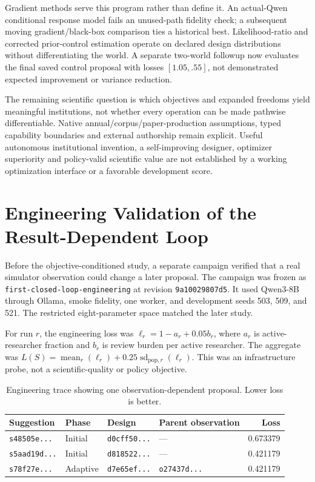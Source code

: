 \documentclass{article}
\newcommand{\code}[1]{\texttt{#1}}
\begin{document}
Gradient methods serve this program rather than define it. An actual-Qwen
conditional response model fails an unused-path fidelity check; a subsequent
moving gradient/black-box comparison ties a historical best. Likelihood-ratio
and corrected prior-control estimation operate on declared design distributions
without differentiating the world. A separate two-world followup now evaluates
the final saved control proposal with losses $[1.05,.55]$, not demonstrated
expected improvement or variance reduction.

The remaining scientific question is which objectives and expanded freedoms
yield meaningful institutions, not whether every operation can be made
pathwise differentiable. Native annual/corpus/paper-production assumptions,
typed capability boundaries and external authorship remain explicit. Useful
autonomous institutional invention, a self-improving designer, optimizer
superiority and policy-valid scientific value are not established by a working
optimization interface or a favorable development score.

\appendix

\section{Engineering Validation of the Result-Dependent Loop}

Before the objective-conditioned study, a separate campaign verified that a real simulator observation could change a later proposal. The campaign was frozen as \code{first-closed-loop-engineering} at revision \code{9a10029807d5}. It used Qwen3-8B through Ollama, smoke fidelity, one worker, and development seeds 503, 509, and 521. The restricted eight-parameter space matched the later study.

For run $r$, the engineering loss was $\ell_r=1-a_r+0.05b_r$, where $a_r$ is active-researcher fraction and $b_r$ is review burden per active researcher. The aggregate was $L(S)=\operatorname{mean}_r(\ell_r)+0.25\operatorname{sd}_{\mathrm{pop},r}(\ell_r)$. This was an infrastructure probe, not a scientific-quality or policy objective.

\begin{table}[h]
\caption{Engineering trace showing one observation-dependent proposal. Lower loss is better.}
\label{tab:engineering-trace}
\centering
\small
\begin{tabular}{llllr}
\toprule
Suggestion & Phase & Design & Parent observation & Loss \\
\midrule
\code{s48505e...} & Initial & \code{d0cff50...} & --- & 0.673379 \\
\code{s5aad19d...} & Initial & \code{d818522...} & --- & 0.421179 \\
\code{s78f27e...} & Adaptive & \code{d7e65ef...} & \code{o27437d...} & 0.421179 \\
\bottomrule
\end{tabular}
\end{table}
\end{document}
